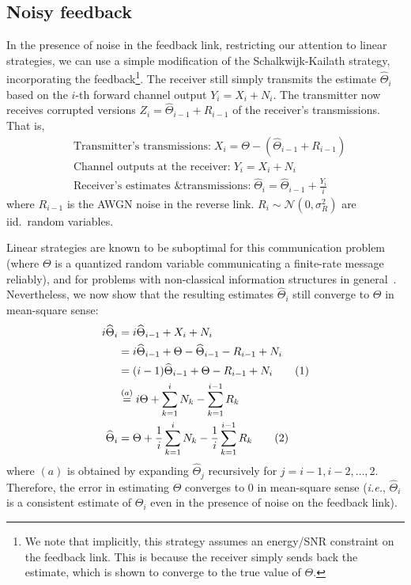 \documentclass[letterpaper, 10pt, conference]{ieeeconf}
\newcommand\numberthis{\stepcounter{equation}\tag{\theequation}}
\begin{document}
\subsection{Noisy feedback}
\label{sec:sk-noisy}

In the presence of noise in the feedback link, restricting our attention to linear strategies, we can use a simple modification of the Schalkwijk-Kailath strategy, incorporating the feedback\footnote{We note that implicitly, this strategy assumes an energy/SNR constraint on the feedback link. This is because the receiver simply sends back the estimate, which is shown to converge to the true value of $\Theta$.}. The receiver still simply transmits the estimate $\widehat{\Theta}_i$ based on the $i$-th forward channel output $Y_i=X_i+N_i$. The transmitter now receives corrupted versions $Z_i=\widehat\Theta_{i-1} + R_{i-1}$ of the receiver's transmissions. That is,
\begin{align}
	& \text{Transmitter's transmissions:}\;X_i = \Theta - (\widehat\Theta_{i-1} + R_{i-1}) \\ \label{eq:noisy-tx-x}
	& \text{Channel outputs at the receiver:}\;	Y_i = X_i + N_i \\
	& \text{Receiver's estimates \& transmissions:}\;	\widehat\Theta_i = \widehat\Theta_{i-1} + \frac{Y_i}{i}
\end{align}
where $R_{i-1}$ is the AWGN noise in the reverse link. $R_i \sim \mathcal{N}(0, \sigma_R^2)$ are iid.\ random variables.

Linear strategies are known to be suboptimal for this communication problem~\cite{YoungHanKimPaper} (where $\Theta$ is a quantized random variable communicating a finite-rate message reliably), and for problems with non-classical information structures in general~\cite{Witsenhausen68}. Nevertheless, we now show that the resulting estimates $\widehat{\Theta}_i$  still converge to $\Theta$ in mean-square sense:
\begin{align*}
	i\widehat\Theta_i &= i\widehat\Theta_{i-1} + X_i + N_i \\
					  &= i\widehat\Theta_{i-1} + \Theta - \widehat\Theta_{i-1} - R_{i-1} + N_i \\
					  &= (i-1) \widehat\Theta_{i-1} + \Theta - R_{i-1} + N_i \numberthis \label{eq:theta_hat_i-noisy-once} \\
					  &\overset{(a)}{=} i\Theta + \sum_{k=1}^i N_k - \sum_{k=1}^{i-1} R_k \\
	\widehat\Theta_i  &= \Theta + \frac{1}{i} \sum_{k=1}^i N_k - \frac{1}{i} \sum_{k=1}^{i-1} R_k \numberthis \label{eq:theta_hat_i-noisy}
\end{align*}
where $(a)$ is obtained by expanding $\widehat{\Theta}_j$ recursively for $j=i-1,i-2,\ldots,2$. Therefore, the error in estimating $\Theta$ converges to $0$ in mean-square sense (\textit{i.e.}, $\widehat{\Theta}_i$ is a consistent estimate of $\Theta_i$ even in the presence of noise on the feedback link).
\end{document}

